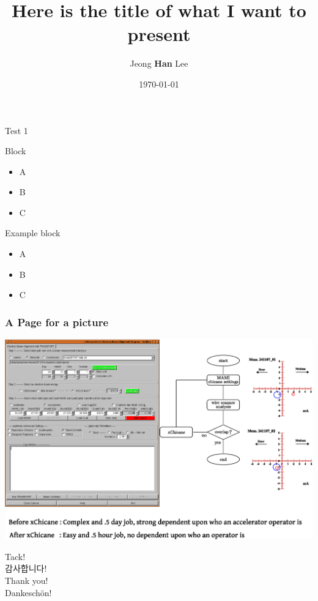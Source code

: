 \documentclass[
  9pt
  , table
  , ignorenonframetext
]{beamer}
\title{Here is the title of what I want to present}
\author{Jeong \textbf{Han} Lee}%
\institute{
  Integrated Control System Division\\
  \textbf{ESS}, Sweden
}
\date{\today}%
\begin{document}
 
\begin{frame}[plain]
  \titlepage
\end{frame}


\begin{frame}{Test 1}
  \begin{block}{Block}
    \begin{itemize}
    \item A
    \item B
    \item C
    \end{itemize}
  \end{block}
  \begin{exampleblock}{Example block}
    \begin{itemize}
    \item A
    \item B
    \item C
    \end{itemize}
  \end{exampleblock}
\end{frame}




\begin{frame}
  \frametitle{A Page for a picture}
  \includegraphics[width=\columnwidth]{./pictures/xchicane.eps}
\end{frame}


\begin{frame}[plain]
  \begin{center}
            {\LARGE Tack!}  \\\vspace{6mm}
            {\LARGE 감사합니다!}\\\vspace{6mm}
            {\LARGE Thank you!}  \\\vspace{6mm}
            {\LARGE Dankesch\"on!} \\\vspace{6mm}
             {\LARGE \smiley } 
  \end{center}
  
\end{frame}
\end{document}
